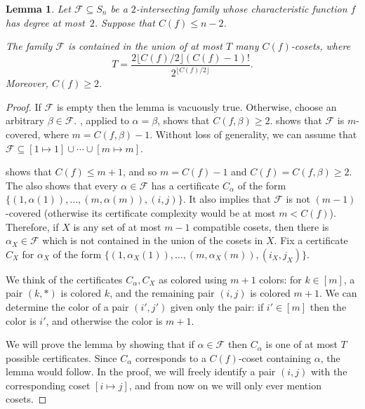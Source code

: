 \documentclass[10pt,a4paper]{amsart}
\newtheorem{lemma}[theorem]{Lemma}
\theoremstyle{definition}
\providecommand{\coset}[2]{[#1 \mapsto #2]}
\begin{document}
\begin{lemma} \label{lem:main-ub-sym}
Let $\mathcal{F} \subseteq S_n$ be a $2$-intersecting family whose characteristic function $f$ has degree at most~$2$. Suppose that $C(f) \leq n-2$.

The family $\mathcal{F}$ is contained in the union of at most $T$ many $C(f)$-cosets, where
\[
 T = \frac{2\lfloor C(f)/2 \rfloor (C(f) - 1)!}{2^{\lfloor C(f)/2 \rfloor}}.
\]
Moreover, $C(f) \geq 2$.
\end{lemma}
\begin{proof}
If $\mathcal{F}$ is empty then the lemma is vacuously true. Otherwise, choose an arbitrary $\beta \in \mathcal{F}$. , applied to $\alpha = \beta$, shows that $C(f,\beta) \geq 2$.  shows that $\mathcal{F}$ is $m$-covered, where $m = C(f,\beta) - 1$. Without loss of generality, we can assume that $\mathcal{F} \subseteq \coset{1}{1} \cup \cdots \cup \coset{m}{m}$.

 shows that $C(f) \leq m + 1$, and so $m = C(f) - 1$ and $C(f) = C(f,\beta) \geq 2$. The  also shows that every $\alpha \in \mathcal{F}$ has a certificate $C_\alpha$ of the form $\{(1,\alpha(1)),\ldots,(m,\alpha(m)),(i,j)\}$.
It also implies that $\mathcal{F}$ is not $(m-1)$-covered (otherwise its certificate complexity would be at most $m < C(f)$). Therefore, if $X$ is any set of at most $m-1$ compatible cosets, then there is $\alpha_X \in \mathcal{F}$ which is not contained in the union of the cosets in $X$. Fix a certificate $C_X$ for $\alpha_X$ of the form $\{(1,\alpha_X(1)),\ldots,(m,\alpha_X(m)),(i_X,j_X)\}$.

We think of the certificates $C_\alpha,C_X$ as colored using $m + 1$ colors: for $k \in [m]$, a pair $(k,\ast)$ is colored $k$, and the remaining pair $(i,j)$ is colored $m+1$. We can determine the color of a pair $(i',j')$ given only the pair: if $i' \in [m]$ then the color is $i'$, and otherwise the color is $m+1$.

We will prove the lemma by showing that if $\alpha \in \mathcal{F}$ then $C_\alpha$ is one of at most $T$ possible certificates. Since $C_\alpha$ corresponds to a $C(f)$-coset containing $\alpha$, the lemma would follow.
In the proof, we will freely identify a pair $(i,j)$ with the corresponding coset $\coset{i}{j}$, and from now on we will only ever mention cosets.

\smallskip


\end{proof}
\end{document}
